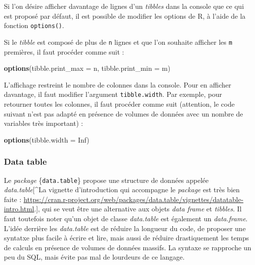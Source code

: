 \documentclass[
  11pt,
]{book}
\newenvironment{Shaded}{\begin{snugshade}}{\end{snugshade}}
\newcommand{\DataTypeTok}[1]{\textcolor[rgb]{0.13,0.29,0.53}{#1}}
\newcommand{\KeywordTok}[1]{\textcolor[rgb]{0.13,0.29,0.53}{\textbf{#1}}}
\newcommand{\NormalTok}[1]{#1}
\newcommand{\OtherTok}[1]{\textcolor[rgb]{0.56,0.35,0.01}{#1}}
\numberwithin{equation}{section}
\numberwithin{countremarque}{section}
\begin{document}
Si l'on désire afficher davantage de lignes d'un \emph{tibbles} dans la console que ce qui est proposé par défaut, il est possible de modifier les options de R, à l'aide de la fonction \texttt{options()}.

Si le \emph{tibble} est composé de plus de \texttt{n} lignes et que l'on souhaite afficher les \texttt{m} premières, il faut procéder comme suit :

\begin{Shaded}
\begin{Highlighting}[]
\KeywordTok{options}\NormalTok{(}\DataTypeTok{tibble.print\_max =}\NormalTok{ n, }\DataTypeTok{tibble.print\_min =}\NormalTok{ m)}
\end{Highlighting}
\end{Shaded}

L'affichage restreint le nombre de colonnes dans la console. Pour en afficher davantage, il faut modifier l'argument \texttt{tibble.width}. Par exemple, pour retourner toutes les colonnes, il faut procéder comme suit (attention, le code suivant n'est pas adapté en présence de volumes de données avec un nombre de variables très important) :

\begin{Shaded}
\begin{Highlighting}[]
\KeywordTok{options}\NormalTok{(}\DataTypeTok{tibble.width =} \OtherTok{Inf}\NormalTok{)}
\end{Highlighting}
\end{Shaded}

\hypertarget{data-table}{%
\subsubsection{Data table}\label{data-table}}

Le \emph{package} \{\texttt{data.table}\} propose une structure de données appelée \emph{data.table}{[}\^{}La vignette d'introduction qui accompagne le \emph{package} est très bien faite : \url{https://cran.r-project.org/web/packages/data.table/vignettes/datatable-intro.html}.{]}, qui se veut être une alternative aux objets \emph{data frame} et \emph{tibbles}. Il faut toutefois noter qu'un objet de classe \emph{data.table} est également un \emph{data.frame}. L'idée derrière les \emph{data.table} est de réduire la longueur du code, de proposer une syntatxe plus facile à écrire et lire, mais aussi de réduire drastiquement les temps de calculs en présence de volumes de données massifs. La syntaxe se rapproche un peu du SQL, mais évite pas mal de lourdeurs de ce langage.
\end{document}
